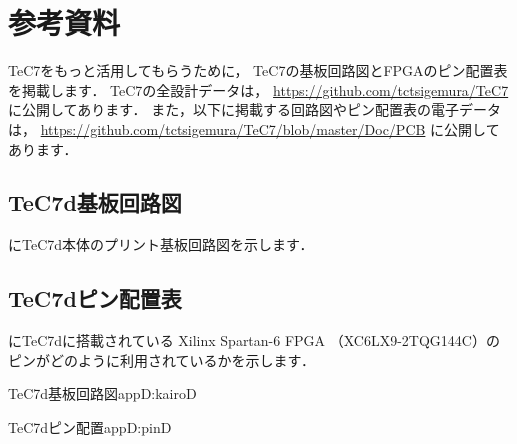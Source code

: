 \renewcommand{\myincludegraphics}[2]{\texttt{[image: appD/\#1]}}

\newpage
\onecolumn
\chapter{参考資料}

TeC7をもっと活用してもらうために，
TeC7の基板回路図とFPGAのピン配置表を掲載します．
TeC7の全設計データは，
\url{https://github.com/tctsigemura/TeC7}
に公開してあります．
また，以下に掲載する回路図やピン配置表の電子データは，
\url{https://github.com/tctsigemura/TeC7/blob/master/Doc/PCB}
に公開してあります．



\section{TeC7d基板回路図}
にTeC7d本体のプリント基板回路図を示します．

\section{TeC7dピン配置表}
にTeC7dに搭載されている
Xilinx Spartan-6 FPGA （XC6LX9-2TQG144C）の
ピンがどのように利用されているかを示します．



\newpage
{}
           {TeC7d基板回路図}{appD:kairoD}

\newpage
{}
           {TeC7dピン配置}{appD:pinD}
